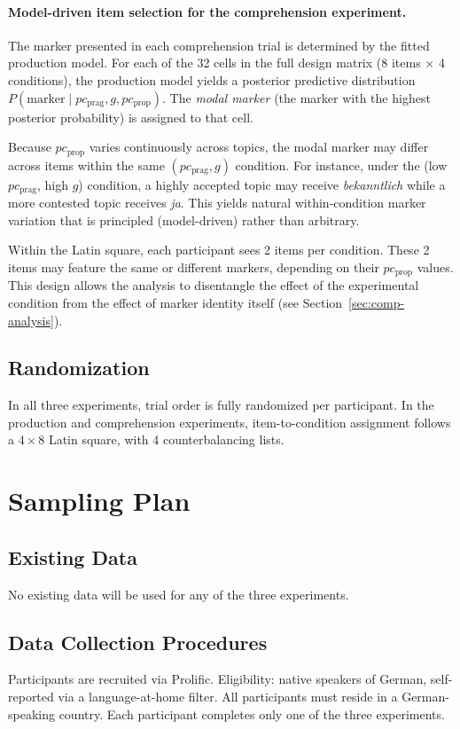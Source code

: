 \documentclass[12pt]{article}
\begin{document}
\paragraph{Model-driven item selection for the comprehension experiment.}
The marker presented in each comprehension trial is determined by the fitted production model. For each of the 32 cells in the full design matrix (8 items $\times$ 4 conditions), the production model yields a posterior predictive distribution $P(\text{marker} \mid pc_{\text{prag}}, g, pc_{\text{prop}})$. The \emph{modal marker} (the marker with the highest posterior probability) is assigned to that cell.

Because $pc_{\text{prop}}$ varies continuously across topics, the modal marker may differ across items within the same $(pc_{\text{prag}}, g)$ condition. For instance, under the (low $pc_{\text{prag}}$, high $g$) condition, a highly accepted topic may receive \textit{bekanntlich} while a more contested topic receives \textit{ja}. This yields natural within-condition marker variation that is principled (model-driven) rather than arbitrary.

Within the Latin square, each participant sees 2 items per condition. These 2 items may feature the same or different markers, depending on their $pc_{\text{prop}}$ values. This design allows the analysis to disentangle the effect of the experimental condition from the effect of marker identity itself (see Section~\ref{sec:comp-analysis}).

\subsection{Randomization}
In all three experiments, trial order is fully randomized per participant. In the production and comprehension experiments, item-to-condition assignment follows a $4 \times 8$ Latin square, with 4 counterbalancing lists.


\section{Sampling Plan}

\subsection{Existing Data}
No existing data will be used for any of the three experiments.

\subsection{Data Collection Procedures}
Participants are recruited via Prolific. Eligibility: native speakers of German, self-reported via a language-at-home filter. All participants must reside in a German-speaking country. Each participant completes only one of the three experiments.
\end{document}
